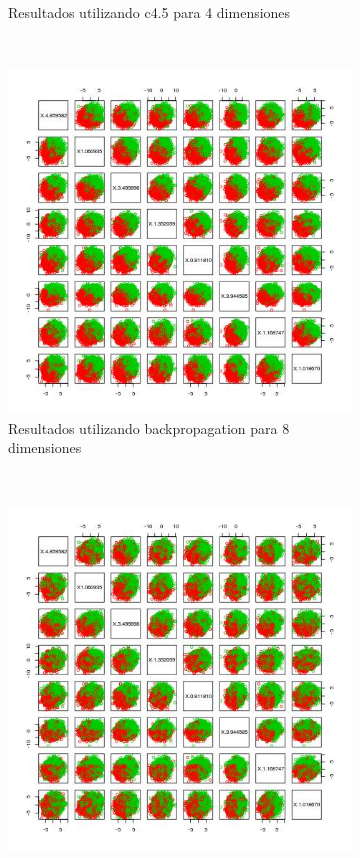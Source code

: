 \documentclass[12pt, a4paper]{article}
\begin{document}
\begin{figure}
\begin{subfigure}[b]{0.45\textwidth}
        \caption{Resultados utilizando c4.5 para 4 dimensiones}  
    \end{subfigure}


~ %
    \begin{subfigure}[b]{0.45\textwidth}
        \includegraphics[width=\textwidth]{prediccionA8}
        \caption{Resultados utilizando backpropagation para 8 dimensiones}  
    \end{subfigure}
      ~ %
    \begin{subfigure}[b]{0.45\textwidth}
        \includegraphics[width=\textwidth]{prediccionA8tree}

\end{subfigure}
\end{figure}
\end{document}
